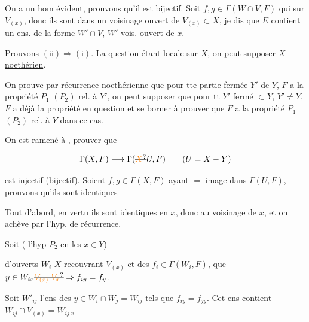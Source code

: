 On a un hom évident, prouvons qu'il est bijectif. Soit $f,g\in\Gamma(W\cap V,F)$ qui    sur $V_{(x)}$, donc ils sont  dans un voisinage ouvert  de $V_{(x)}\subset X$,  je dis que $E$ contient un ens. de la forme $W'\cap V$, $W'$ vois. ouvert de $x$.


Prouvons $(\mathrm{ii})\Longrightarrow(\mathrm{i})$. La question étant locale sur $X$, on peut supposer $X$ \uline{noethérien}.

On prouve par récurrence noethérienne que pour tte partie fermée $Y'$ de $Y$, $F$ a la propriété $P_1$ $(P_2)$ rel. à $Y'$, on peut supposer que pour tt $Y'$ fermé $\subset Y$, $Y'\ne Y$, $F$ a déjà la propriété en question  et se borner à prouver que $F$ a la propriété $P_1$ $(P_2)$ rel. à $Y$ dans ce cas.

 On est ramené à , prouver que

\[
\Gamma(X,F)\longrightarrow\Gamma(\deleted{\unsure{X}}U,F)\qquad (U=X-Y)
\]

est injectif (bijectif). Soient $f,g\in\Gamma(X,F)$ ayant $=$ image dans $\Gamma(U,F)$, prouvons qu'ils sont identiques\unsure{;|,} 


 Tout d'abord, en vertu   ils sont identiques en $x$, donc au voisinage de $x$, et on achève par l'hyp. de récurrence.

Soit  ( l'hyp $P_2$ en les $x\in Y$)


d'ouverts $W_i$  $X$ recouvrant $V_{(x)}$  et des $f_i\in\Gamma(W_i,F)$,  que $y\in W_{ix}\deleted{\unsure{V_{(x)}|V_x}}\Rightarrow f_{iy}=f_y$.

Soit  $W'_{ij}$ l'ens des $y\in W_i\cap W_j=W_{ij}$ tels que $f_{iy}=f_{jy}$. Cet ens   contient $W_{ij}\cap V_{(x)}=W_{ij\,x}$

